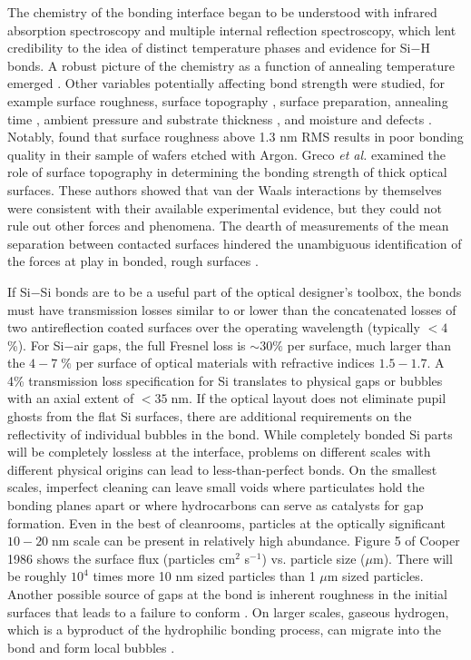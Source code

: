 \documentclass[osajnl,twocolumn,showpacs,superscriptaddress,11pt]{revtex4-1} %
\begin{document}
The chemistry of the bonding interface began to be understood with infrared absorption spectroscopy and multiple internal reflection spectroscopy\cite{feijoo1994}, which lent credibility to the idea of distinct temperature phases and evidence for Si$-$H bonds\cite{1995ApPhA..61..101R}.  A robust picture of the chemistry as a function of annealing temperature emerged \cite{1996JaJAP..35.2102R, 1998AnRMS..28..215G}.  Other variables potentially affecting bond strength were studied, for example surface roughness\cite{JJAP.37.4197}, surface topography \cite{2001JOptA...3...85G}, surface preparation\cite{1996ApPhL..68.2222T}, annealing time \cite{2000JAP....88.4404H}, ambient pressure and substrate thickness \cite{1995ApPhL..67..863G, 2007ApOpt..46.6793H}, and moisture and defects \cite{2001JAP....89.6013L}.  Notably, \cite{JJAP.37.4197} found that surface roughness above 1.3 nm RMS results in poor bonding quality in their sample of wafers etched with Argon.  Greco \emph{et al.} examined the role of surface topography in determining the bonding strength of thick optical surfaces.  These authors showed that van der Waals interactions by themselves were consistent with their available experimental evidence, but they could not rule out other forces and phenomena.  The dearth of measurements of the mean separation between contacted surfaces hindered the unambiguous identification of the forces at play in bonded, rough surfaces \cite{2001JOptA...3...85G}.


If Si$-$Si bonds are to be a useful part of the optical designer's toolbox, the bonds must have transmission losses similar to or lower than the concatenated losses of two antireflection coated surfaces over the operating wavelength (typically $< 4$\%).  For Si$-$air gaps, the full Fresnel loss is $\sim30\%$ per surface, much larger than the $4-7\;\%$ per surface of optical materials with refractive indices $1.5-1.7$. A 4\% transmission loss specification for Si translates to physical gaps or bubbles with an axial extent of $ < 35\;$nm.  If the optical layout does not eliminate pupil ghosts from the flat Si surfaces, there are additional requirements on the reflectivity of individual bubbles in the bond. While completely bonded Si parts will be completely lossless at the interface, problems on different scales with different physical origins can lead to less-than-perfect bonds.  On the smallest scales, imperfect cleaning can leave small voids where particulates hold the bonding planes apart \cite{Mitani1990} or where hydrocarbons can serve as catalysts for gap formation.  Even in the best of cleanrooms, particles at the optically significant $10-20\;$nm scale can be present in relatively high abundance. Figure 5 of Cooper 1986 \cite{doi:10.1080/02786828608959094} shows the surface flux (particles cm$^2$ s$^{-1}$) vs. particle size ($\mu$m). There will be roughly $10^4$ times more 10 nm sized particles than 1 $\mu$m sized particles.  Another possible source of gaps at the bond is inherent roughness in the initial surfaces that leads to a failure to conform \cite{2001JOptA...3...85G}.  On larger scales, gaseous hydrogen, which is a byproduct of the hydrophilic bonding process, can migrate into the bond and form local bubbles \cite{Masteika2014}.  
\end{document}

